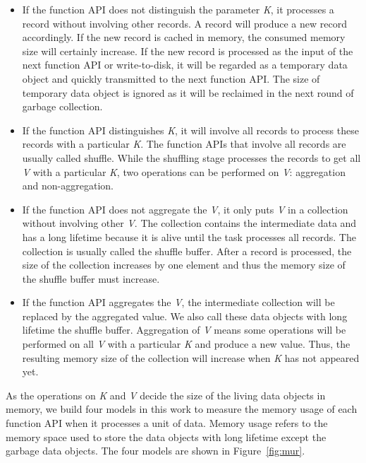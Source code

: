 \begin{itemize}

\item If the function API does not distinguish the parameter \textit{K}, it processes a record without involving other records. A record will produce a new record accordingly. If the new record is cached in memory, the consumed memory size will certainly increase. If the new record is processed as the input of the next function API or write-to-disk, it will be regarded as a temporary data object and quickly transmitted to the next function API. The size of temporary data object is ignored as it will be reclaimed in the next round of garbage collection.

\item If the function API distinguishes \textit{K}, it will involve all records to process these records with a particular \textit{K}. The function APIs that involve all records are usually called shuffle. While the shuffling stage processes the records to get all \textit{V} with a particular \textit{K}, two operations can be performed on \textit{V}: aggregation and non-aggregation.

\item If the function API does not aggregate the \textit{V}, it only puts \textit{V} in a collection without involving other \textit{V}. The collection contains the intermediate data and has a long lifetime because it is alive until the task processes all records. The collection is usually called the shuffle buffer. After a record is processed, the size of the collection increases by one element and thus the memory size of the shuffle buffer must increase.

\item If the function API aggregates the \textit{V}, the intermediate collection will be replaced by the aggregated value. We also call these data objects with long lifetime the shuffle buffer. Aggregation of \textit{V} means some operations will be performed on all \textit{V} with a particular \textit{K} and produce a new value. Thus, the resulting memory size of the collection will increase when \textit{K} has not appeared yet.

\end{itemize}

As the operations on \textit{K} and \textit{V} decide the size of the living data objects in memory, we build four models in this work to measure the memory usage of each function API when it processes a unit of data. 
Memory usage refers to the memory space used to store the data objects with long lifetime except the garbage data objects. The four models are shown in Figure~\ref{fig:mur}. 

